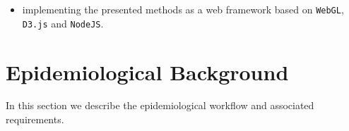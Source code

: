 \documentclass[journal]{style/vgtc} 			          %
\begin{document}
\begin{itemize}
	\item implementing the presented methods as a web framework based on \texttt{WebGL}, \texttt{D3.js} and \texttt{NodeJS}.
\end{itemize}



\section{Epidemiological Background} \label{MedicalAndTechnicalBackground}

In this section we describe the epidemiological workflow and associated requirements.
%
%
\end{document}
